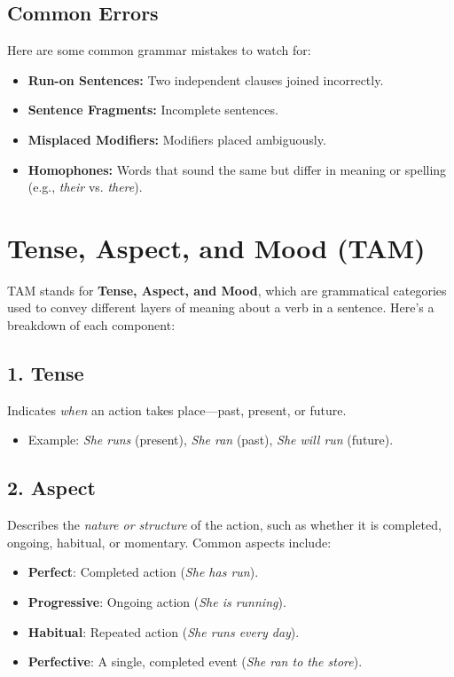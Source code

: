 \documentclass{book}
\begin{document}
\section{Common Errors}
Here are some common grammar mistakes to watch for:
\begin{itemize}
	\item \textbf{Run-on Sentences:} Two independent clauses joined incorrectly.
	\item \textbf{Sentence Fragments:} Incomplete sentences.
	\item \textbf{Misplaced Modifiers:} Modifiers placed ambiguously.
	\item \textbf{Homophones:} Words that sound the same but differ in meaning or spelling (e.g., \textit{their} vs. \textit{there}).
\end{itemize}

\chapter{Tense, Aspect, and Mood (TAM)}

TAM stands for \textbf{Tense, Aspect, and Mood}, which are grammatical categories used to convey different layers of meaning about a verb in a sentence. Here’s a breakdown of each component:

\section*{1. Tense}
Indicates \emph{when} an action takes place—past, present, or future.  
\begin{itemize}
	\item Example: \emph{She runs} (present), \emph{She ran} (past), \emph{She will run} (future).
\end{itemize}

\section*{2. Aspect}
Describes the \emph{nature or structure} of the action, such as whether it is completed, ongoing, habitual, or momentary. Common aspects include:
\begin{itemize}
	\item \textbf{Perfect}: Completed action (\emph{She has run}).
	\item \textbf{Progressive}: Ongoing action (\emph{She is running}).
	\item \textbf{Habitual}: Repeated action (\emph{She runs every day}).
	\item \textbf{Perfective}: A single, completed event (\emph{She ran to the store}).
\end{itemize}
\end{document}

